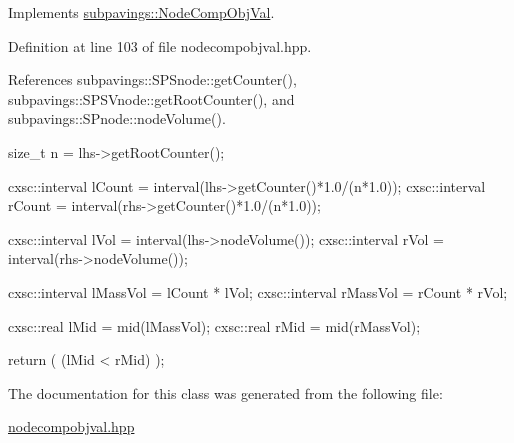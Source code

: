 \-Implements \hyperlink{classsubpavings_1_1NodeCompObjVal_a0c12ddc23446e5be6bb71d024ec40c62}{subpavings\-::\-Node\-Comp\-Obj\-Val}.



\-Definition at line 103 of file nodecompobjval.\-hpp.



\-References subpavings\-::\-S\-P\-Snode\-::get\-Counter(), subpavings\-::\-S\-P\-S\-Vnode\-::get\-Root\-Counter(), and subpavings\-::\-S\-Pnode\-::node\-Volume().


\begin{DoxyCode}
      { 
        size_t n = lhs->getRootCounter();
        
        cxsc::interval lCount = interval(lhs->getCounter()*1.0/(n*1.0));
        cxsc::interval rCount = interval(rhs->getCounter()*1.0/(n*1.0));
        
        cxsc::interval lVol = interval(lhs->nodeVolume());
        cxsc::interval rVol = interval(rhs->nodeVolume());
        
        cxsc::interval lMassVol = lCount * lVol;
        cxsc::interval rMassVol = rCount * rVol;
       
        cxsc::real lMid = mid(lMassVol);
        cxsc::real rMid = mid(rMassVol);
        
        return ( (lMid < rMid) );
    }
\end{DoxyCode}


\-The documentation for this class was generated from the following file\-:\begin{DoxyCompactItemize}
\item 
\hyperlink{nodecompobjval_8hpp}{nodecompobjval.\-hpp}\end{DoxyCompactItemize}
